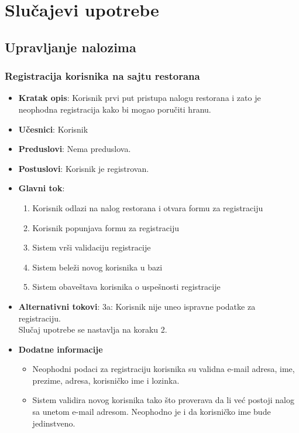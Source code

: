 \section{Slučajevi upotrebe}
\subsection{Upravljanje nalozima}
\subsubsection{Registracija korisnika na sajtu restorana}
\begin{itemize}
    \item \textbf{Kratak opis}:
    Korisnik prvi put pristupa nalogu restorana i zato je neophodna registracija kako bi mogao poručiti hranu.
    \item \textbf{Učesnici}:
    Korisnik
    \item \textbf{Preduslovi}:
    Nema preduslova. 
    \item \textbf{Postuslovi}:
    Korisnik je registrovan. 
    \item \textbf{Glavni tok}:
   \begin{enumerate}
        \item Korisnik odlazi na nalog restorana i otvara formu za registraciju
        \item Korisnik popunjava formu za registraciju
        \item Sistem vrši validaciju registracije
        \item Sistem beleži novog korisnika u bazi
        \item Sistem obaveštava korisnika o uspešnosti registracije
\end{enumerate}
\end{itemize}
\begin {itemize}
\item \textbf {Alternativni tokovi}: 
 3a: Korisnik nije uneo ispravne podatke za registraciju.\\
 Slučaj upotrebe se nastavlja na koraku 2.
 \end{itemize}
 \begin{itemize} 
     \item \textbf{Dodatne informacije}
 \begin{itemize}
     \item Neophodni podaci za registraciju korisnika su validna e-mail adresa, ime, prezime, adresa, korisničko ime i lozinka.
    \item Sistem validira novog korisnika tako što proverava da li već postoji nalog sa unetom e-mail adresom. Neophodno je i da korisničko ime bude jedinstveno.
 \end{itemize}
 \end{itemize}
 
